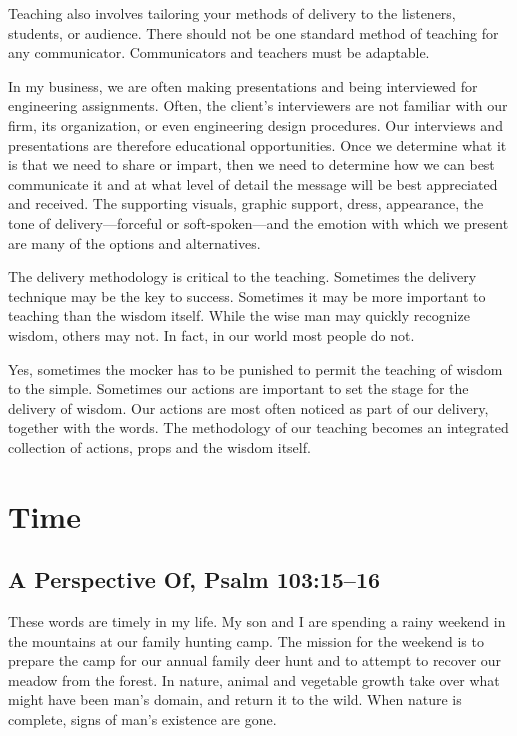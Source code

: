 \documentclass[12pt]{memoir}
\begin{document}
Teaching also involves tailoring your methods of delivery to the listeners, students, or audience. There should not be one standard method of teaching for any communicator. Communicators and teachers must be adaptable.

In my business, we are often making presentations and being interviewed for engineering assignments. Often, the client's interviewers are not familiar with our firm, its organization, or even engineering design procedures. Our interviews and presentations are therefore educational opportunities. Once we determine what it is that we need to share or impart, then we need to determine how we can best communicate it and at what level of detail the message will be best appreciated and received. The supporting visuals, graphic support, dress, appearance, the tone of delivery---forceful or soft-spoken---and the emotion with which we present are many of the options and alternatives.

The delivery methodology is critical to the teaching. Sometimes the delivery technique may be the key to success. Sometimes it may be more important to teaching than the wisdom itself. While the wise man may quickly recognize wisdom, others may not. In fact, in our world most people do not.

Yes, sometimes the mocker has to be punished to permit the teaching of wisdom to the simple. Sometimes our actions are important to set the stage for the delivery of wisdom. Our actions are most often noticed as part of our delivery, together with the words. The methodology of our teaching becomes an integrated collection of actions, props and the wisdom itself.

\section{Time}
\subsection[A Perspective Of]{A Perspective Of, Psalm 103:15--16}

These words are timely in my life. My son and I are spending a rainy weekend in the mountains at our family hunting camp. The mission for the weekend is to prepare the camp for our annual family deer hunt and to attempt to recover our meadow from the forest. In nature, animal and vegetable growth take over what might have been man's domain, and return it to the wild. When nature is complete, signs of man's existence are gone.
\end{document}
